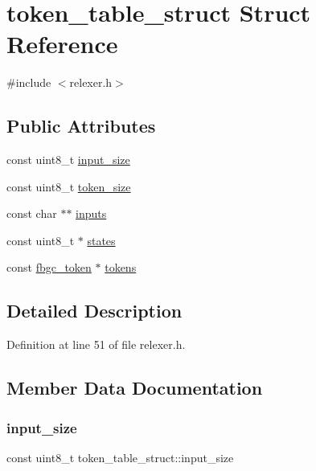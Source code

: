 \hypertarget{structtoken__table__struct}{}\section{token\+\_\+table\+\_\+struct Struct Reference}
\label{structtoken__table__struct}


{\ttfamily \#include $<$relexer.\+h$>$}

\subsection*{Public Attributes}
\begin{DoxyCompactItemize}
\item 
const uint8\+\_\+t \hyperlink{structtoken__table__struct_a8f9831bb9005ca3159e267cd46f44956}{input\+\_\+size}
\item 
const uint8\+\_\+t \hyperlink{structtoken__table__struct_abbfdabf4bf58f1a4d3130cb492eac441}{token\+\_\+size}
\item 
const char $\ast$$\ast$ \hyperlink{structtoken__table__struct_a7487955006b65fce4229a0c2fadaff05}{inputs}
\item 
const uint8\+\_\+t $\ast$ \hyperlink{structtoken__table__struct_a469742d5419b933c29fd2725eaf98353}{states}
\item 
const \hyperlink{tokens_8h_a9d21ebbf42e602eb0cf502c867d20a7e}{fbgc\+\_\+token} $\ast$ \hyperlink{structtoken__table__struct_ad178b9ae86a4af4252df0680aab90c5b}{tokens}
\end{DoxyCompactItemize}


\subsection{Detailed Description}


Definition at line 51 of file relexer.\+h.



\subsection{Member Data Documentation}
\mbox{\label{structtoken__table__struct_a8f9831bb9005ca3159e267cd46f44956}} 
\subsubsection{\texorpdfstring{input\+\_\+size}{input\_size}}
{\footnotesize\ttfamily const uint8\+\_\+t token\+\_\+table\+\_\+struct\+::input\+\_\+size}



